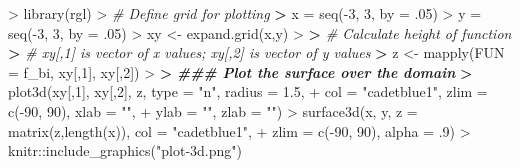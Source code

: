 \documentclass[
]{article}
\newenvironment{Shaded}{\begin{snugshade}}{\end{snugshade}}
\newcommand{\AttributeTok}[1]{\textcolor[rgb]{0.77,0.63,0.00}{#1}}
\newcommand{\CommentTok}[1]{\textcolor[rgb]{0.56,0.35,0.01}{\textit{#1}}}
\newcommand{\DecValTok}[1]{\textcolor[rgb]{0.00,0.00,0.81}{#1}}
\newcommand{\DocumentationTok}[1]{\textcolor[rgb]{0.56,0.35,0.01}{\textbf{\textit{#1}}}}
\newcommand{\ErrorTok}[1]{\textcolor[rgb]{0.64,0.00,0.00}{\textbf{#1}}}
\newcommand{\FloatTok}[1]{\textcolor[rgb]{0.00,0.00,0.81}{#1}}
\newcommand{\FunctionTok}[1]{\textcolor[rgb]{0.00,0.00,0.00}{#1}}
\newcommand{\NormalTok}[1]{#1}
\newcommand{\OtherTok}[1]{\textcolor[rgb]{0.56,0.35,0.01}{#1}}
\newcommand{\SpecialCharTok}[1]{\textcolor[rgb]{0.00,0.00,0.00}{#1}}
\newcommand{\StringTok}[1]{\textcolor[rgb]{0.31,0.60,0.02}{#1}}
\begin{document}
\begin{Shaded}
\begin{Highlighting}[]
\SpecialCharTok{\textgreater{}} \FunctionTok{library}\NormalTok{(rgl)}
\SpecialCharTok{\textgreater{}} \CommentTok{\# Define grid for plotting}
\ErrorTok{\textgreater{}}\NormalTok{ x }\OtherTok{=} \FunctionTok{seq}\NormalTok{(}\SpecialCharTok{{-}}\DecValTok{3}\NormalTok{, }\DecValTok{3}\NormalTok{, }\AttributeTok{by =}\NormalTok{ .}\DecValTok{05}\NormalTok{)}
\SpecialCharTok{\textgreater{}}\NormalTok{ y }\OtherTok{=} \FunctionTok{seq}\NormalTok{(}\SpecialCharTok{{-}}\DecValTok{3}\NormalTok{, }\DecValTok{3}\NormalTok{, }\AttributeTok{by =}\NormalTok{ .}\DecValTok{05}\NormalTok{)}
\SpecialCharTok{\textgreater{}}\NormalTok{ xy }\OtherTok{\textless{}{-}} \FunctionTok{expand.grid}\NormalTok{(x,y)}
\SpecialCharTok{\textgreater{}} 
\ErrorTok{\textgreater{}} \CommentTok{\# Calculate height of function}
\ErrorTok{\textgreater{}} \CommentTok{\# xy[,1] is vector of \textquotesingle{}x\textquotesingle{} values; xy[,2] is vector of \textquotesingle{}y\textquotesingle{} values}
\ErrorTok{\textgreater{}}\NormalTok{ z }\OtherTok{\textless{}{-}} \FunctionTok{mapply}\NormalTok{(}\AttributeTok{FUN =}\NormalTok{ f\_bi, xy[,}\DecValTok{1}\NormalTok{], xy[,}\DecValTok{2}\NormalTok{])}
\SpecialCharTok{\textgreater{}} 
\ErrorTok{\textgreater{}} \DocumentationTok{\#\#\# Plot the surface over the domain}
\ErrorTok{\textgreater{}} \FunctionTok{plot3d}\NormalTok{(xy[,}\DecValTok{1}\NormalTok{], xy[,}\DecValTok{2}\NormalTok{], z, }\AttributeTok{type =} \StringTok{"n"}\NormalTok{, }\AttributeTok{radius =} \FloatTok{1.5}\NormalTok{, }
\SpecialCharTok{+}        \AttributeTok{col =} \StringTok{"cadetblue1"}\NormalTok{, }\AttributeTok{zlim =} \FunctionTok{c}\NormalTok{(}\SpecialCharTok{{-}}\DecValTok{90}\NormalTok{, }\DecValTok{90}\NormalTok{), }\AttributeTok{xlab =} \StringTok{""}\NormalTok{, }
\SpecialCharTok{+}        \AttributeTok{ylab =} \StringTok{""}\NormalTok{, }\AttributeTok{zlab =} \StringTok{""}\NormalTok{)}
\SpecialCharTok{\textgreater{}} \FunctionTok{surface3d}\NormalTok{(x, y, }\AttributeTok{z =} \FunctionTok{matrix}\NormalTok{(z,}\FunctionTok{length}\NormalTok{(x)), }\AttributeTok{col =} \StringTok{"cadetblue1"}\NormalTok{, }
\SpecialCharTok{+}           \AttributeTok{zlim =} \FunctionTok{c}\NormalTok{(}\SpecialCharTok{{-}}\DecValTok{90}\NormalTok{, }\DecValTok{90}\NormalTok{), }\AttributeTok{alpha =}\NormalTok{ .}\DecValTok{9}\NormalTok{)}
\SpecialCharTok{\textgreater{}}\NormalTok{ knitr}\SpecialCharTok{::}\FunctionTok{include\_graphics}\NormalTok{(}\StringTok{"plot{-}3d.png"}\NormalTok{)}
\end{Highlighting}
\end{Shaded}
\end{document}
